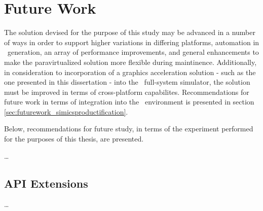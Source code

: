 
\chapter{Future Work}
\label{cha:futurework}
The solution devised for the purpose of this study may be advanced in a number of ways in order to support higher variations in differing platforms, automation in \dvttermabi\ generation, an array of performance improvements, and general enhancements to make the paravirtualized solution more flexible during maintinence.
Additionally, in consideration to incorporation of a graphics acceleration solution - such as the one presented in this dissertation - into the \dvttermsimics\ full-system simulator, the solution must be improved in terms of cross-platform capabilites.
Recommendations for future work in terms of integration into the \dvttermsimics\ environment is presented in section \ref{sec:futurework_simicsproductification}.

Below, recommendations for future study, in terms of the experiment performed for the purposes of this thesis, are presented.\\

\noindent


\ldots



\section{API Extensions}
\label{sec:futurework_apiextensions}
\ldots


